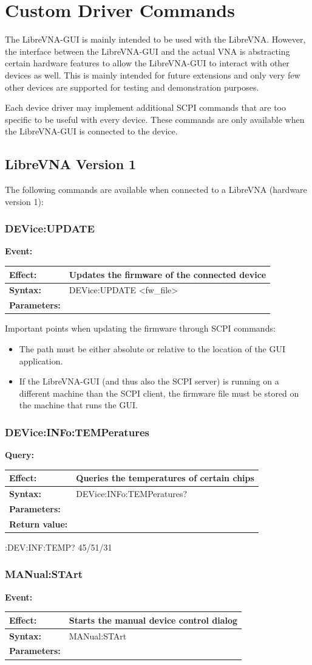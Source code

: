 \documentclass[a4paper,11pt]{article}
\newcommand{\vna}{LibreVNA}
\newcommand{\gui}{\vna{}-GUI}
\newcommand{\event}[3]{
\noindent\textbf{Event:}
\begin{longtable}{p{.15\textwidth} | p{.80\textwidth} } 
\hline
\textbf{Effect:} & #1 \\ \hline
\textbf{Syntax:} & #2 \\ \hline 
\textbf{Parameters:} & \makecell[Xl]{#3} \\ \hline
\end{longtable}
}
\newcommand{\query}[4]{
\noindent\textbf{Query:}
\begin{longtable}{p{.15\textwidth} | p{.80\textwidth} } 
\hline
\textbf{Effect:} & #1 \\ \hline
\textbf{Syntax:} & #2 \\ \hline 
\textbf{Parameters:} & \makecell[tl]{#3} \\ \hline
\textbf{Return value:} & \makecell[tl]{#4} \\ \hline
\end{longtable}
}
\begin{document}
\section{Custom Driver Commands}
The \gui{} is mainly intended to be used with the \vna{}. However, the interface between the \gui{} and the actual VNA is abstracting certain hardware features to allow the \gui{} to interact with other devices as well. This is mainly intended for future extensions and only very few other devices are supported for testing and demonstration purposes.

Each device driver may implement additional SCPI commands that are too specific to be useful with every device. These commands are only available when the \gui{} is connected to the device.

\subsection{LibreVNA Version 1}
The following commands are available when connected to a LibreVNA (hardware version 1):

\subsubsection{DEVice:UPDATE}
\event{Updates the firmware of the connected device}{DEVice:UPDATE <fw\_file>}{<fw\_file> Path to the firmware file}
Important points when updating the firmware through SCPI commands:
\begin{itemize}
\item The path must be either absolute or relative to the location of the GUI application.
\item If the LibreVNA-GUI (and thus also the SCPI server) is running on a different machine than the SCPI client, the firmware file must be stored on the machine that runs the GUI.
\end{itemize}

\subsubsection{DEVice:INFo:TEMPeratures}
\query{Queries the temperatures of certain chips}{DEVice:INFo:TEMPeratures?}{None}{<source>/<1.LO>/<CPU>}
\begin{example}
:DEV:INF:TEMP?
45/51/31
\end{example}

\subsubsection{MANual:STArt}
\event{Starts the manual device control dialog}{MANual:STArt}{None}
\end{document}
